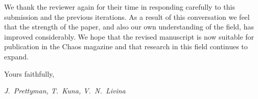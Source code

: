 \documentclass[12pt]{article}
\begin{document}
We thank the reviewer again for their time in responding carefully to this submission and the previous iterations. As a result of this conversation we feel that the strength of the paper, and also our own understanding of the field, has improved considerably. We hope that the revised manuscript is now suitable for publication in the Chaos magazine and that research in this field continues to expand.

\vspace{5mm}

\noindent
Yours faithfully,

\vspace{1mm}

\noindent
\it J.~Prettyman, T.~Kuna, V.~N.~Livina
\end{document}
